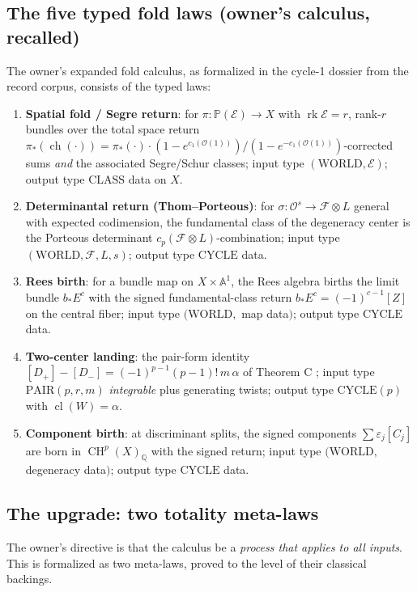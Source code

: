 \documentclass[11pt]{article}
\newcommand{\ch}{\operatorname{ch}}
\newcommand{\cl}{\operatorname{cl}}
\newcommand{\CH}{\operatorname{CH}}
\newcommand{\Oo}{\mathcal{O}}
\newcommand{\tensor}{\otimes}
\newcommand{\Q}{\mathbb{Q}}
\newcommand{\A}{\mathbb{A}}
\newcommand{\Pp}{\mathbb{P}}
\newcommand{\rk}{\operatorname{rk}}
\begin{document}
\subsection{The five typed fold laws (owner's calculus, recalled)}
\label{sec:five}

The owner's expanded fold calculus, as formalized in the cycle-1 dossier from
the record corpus, consists of the typed laws:
\begin{enumerate}
\item[\textup{L1}] \textbf{Spatial fold / Segre return}: for
$\pi\colon\Pp(\mathcal E)\to X$ with $\rk\mathcal E=r$, rank-$r$ bundles over
the total space return $\pi_*(\ch(\cdot))=\pi_*(\cdot)\cdot
(1-e^{c_1(\mathcal O(1))})/(1-e^{-c_1(\mathcal O(1))})$-corrected sums
\emph{and} the associated Segre/Schur classes; input type
$(\mathrm{WORLD},\mathcal E)$; output type $\mathrm{CLASS}$ data on $X$.
\item[\textup{L2}] \textbf{Determinantal return (Thom--Porteous)}: for
$\sigma\colon\Oo^s\to\mathcal F\tensor L$ general with expected codimension,
the fundamental class of the degeneracy center is the Porteous determinant
$c_{p}(\mathcal F\tensor L)$-combination; input type
$(\mathrm{WORLD},\mathcal F,L,s)$; output type $\mathrm{CYCLE}$ data.
\item[\textup{L3}] \textbf{Rees birth}: for a bundle map on
$X\times\A^1$, the Rees algebra births the limit bundle $b_*E^c$ with the
signed fundamental-class return $b_*E^c=(-1)^{c-1}[Z]$ on the central fiber;
input type $(\mathrm{WORLD},$ map data$)$; output type
$\mathrm{CYCLE}$ data.
\item[\textup{L4}] \textbf{Two-center landing}: the pair-form identity
$[D_+]-[D_-]=(-1)^{p-1}(p-1)!\,m\,\alpha$ of Theorem C
\cite{GST-gr25}; input type $\mathrm{PAIR}(p,r,m)$ \emph{integrable} plus
generating twists; output type $\mathrm{CYCLE}(p)$ with
$\cl(W)=\alpha$.
\item[\textup{L5}] \textbf{Component birth}: at discriminant splits, the
signed components $\sum\varepsilon_j[C_j]$ are born in $\CH^p(X)_\Q$ with the
signed return; input type $(\mathrm{WORLD},$ degeneracy data$)$; output type
$\mathrm{CYCLE}$ data.
\end{enumerate}

\subsection{The upgrade: two totality meta-laws}
\label{sec:totality}

The owner's directive is that the calculus be a \emph{process that applies to
all inputs}.  This is formalized as two meta-laws, proved to the level of
their classical backings.
\end{document}
